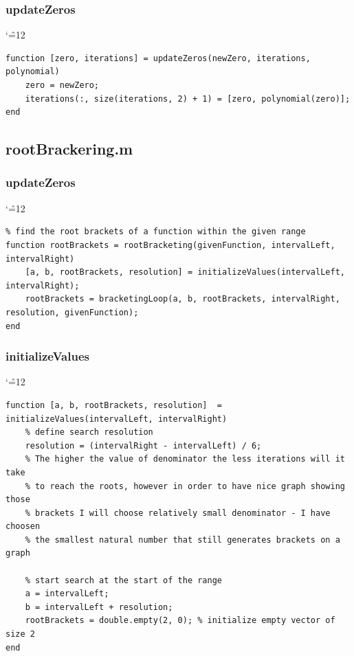 \documentclass[12pt]{report}
\newenvironment{simplechar}{%
   \catcode`\^=12
}{}
\begin{document}
\newpage
\subsubsection{updateZeros}
\begin{simplechar}
\begin{lstlisting}
function [zero, iterations] = updateZeros(newZero, iterations, polynomial)
    zero = newZero;
    iterations(:, size(iterations, 2) + 1) = [zero, polynomial(zero)];
end
\end{lstlisting}
\end{simplechar}

\subsection{rootBrackering.m}

\subsubsection{updateZeros}
\begin{simplechar}
\begin{lstlisting}
% find the root brackets of a function within the given range
function rootBrackets = rootBracketing(givenFunction, intervalLeft, intervalRight)
    [a, b, rootBrackets, resolution] = initializeValues(intervalLeft, intervalRight);
    rootBrackets = bracketingLoop(a, b, rootBrackets, intervalRight, resolution, givenFunction);
end
\end{lstlisting}
\end{simplechar}

\newpage
\subsubsection{initializeValues}
\begin{simplechar}
\begin{lstlisting}
function [a, b, rootBrackets, resolution]  = initializeValues(intervalLeft, intervalRight)
    % define search resolution
    resolution = (intervalRight - intervalLeft) / 6;
    % The higher the value of denominator the less iterations will it take
    % to reach the roots, however in order to have nice graph showing those
    % brackets I will choose relatively small denominator - I have choosen
    % the smallest natural number that still generates brackets on a graph

    % start search at the start of the range
    a = intervalLeft;
    b = intervalLeft + resolution;
    rootBrackets = double.empty(2, 0); % initialize empty vector of size 2
end
\end{lstlisting}
\end{simplechar}
\end{document}

